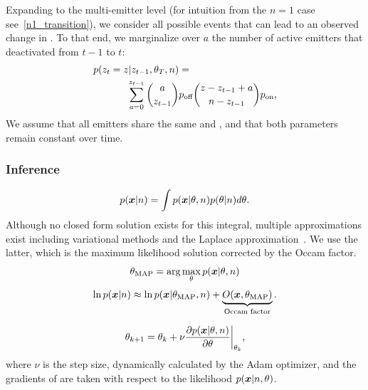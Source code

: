 Expanding to the multi-emitter level (for intuition from the $n=1$ case see~\ref{n1_transition}), 
we consider all possible events that can lead to an observed change in \z{}. To 
that end, we marginalize over $a$ the number of active emitters that deactivated 
from $t-1$ to $t$:
  \begin{align}
    \label{eq:method:transition}
    p(z_{t} = z | z_{t-1}, \theta_{T}, n) &=\\
    \sum_{a = 0}^{z_{t-1}}
      {a \choose z_{t-1}}
      &\poff
      {z - z_{t-1} + a \choose \n - z_{t-1}}
      \pon
      \text{,} \notag
  \end{align}
  We assume that all emitters share the same \pon and \poff, and that
  both parameters remain constant over time.

\subsubsection{Inference}

%
\begin{equation*}
  p(\bm{x} | n) = \int p(\bm{x} | \theta, n) p(\theta | n) d\theta
  \text{.}
\end{equation*}
  Although no closed form solution exists for this integral, multiple
  approximations exist including variational methods
  \cite{bronson_learning_2009} and the Laplace
  approximation~\citep{bishop_pattern_2006}.
  We use the latter, which is the maximum likelihood solution corrected by the
  Occam factor.
    \begin{equation}
      \theta_\text{MAP} = \text{arg}\max_{\theta} p(\bm{x} | \theta, n)
    \end{equation}
  \begin{equation}
    \ln p(\bm{x} | n) \approx
      \ln p(\bm{x} | \theta_\text{MAP}, n) +
      \underbrace{O(\bm{x}, \theta_\text{MAP})}_\text{Occam factor}
    \text{.}
    \label{eq:method:evidence_with_m}
  \end{equation}

  \begin{align}
    \theta_{k+1} =
      \theta_{k} +
      \nu \frac{\partial p(\bm{x} | \theta, n)}{\partial \theta}
    \bigg\rvert_{\theta_{k}}
    \notag
    \text{,}
  \end{align}
  where $\nu$ is the step size, dynamically calculated by the Adam optimizer,
  and the gradients of \parameters are taken with respect to the likelihood
  $p(\bm{x} | n, \theta)$.

